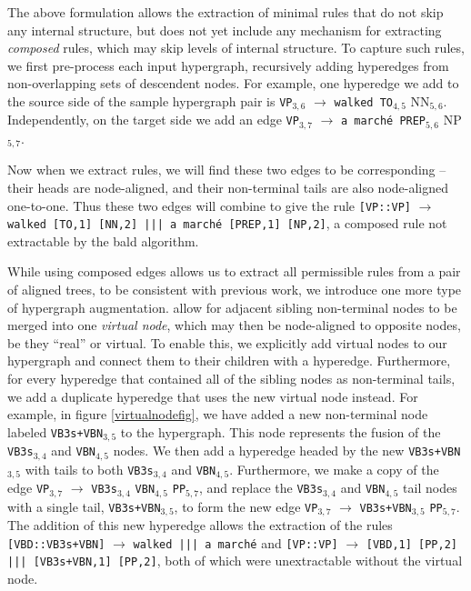 \documentclass[nofonts]{pbml} %
\begin{document}
The above formulation allows the extraction of minimal rules that do not skip any internal structure, but does not yet
include any mechanism for extracting \emph{composed} rules, which may skip levels of internal structure.
To capture such rules, we first pre-process each input hypergraph, recursively adding hyperedges from non-overlapping sets
of descendent nodes. For example, one hyperedge we add to the source side of the sample hypergraph pair is
\texttt{VP}$_{3,6}$ $\rightarrow$ \texttt{walked TO}$_{4,5}$ NN$_{5,6}$. Independently, on the target side we add an edge
\texttt{VP}$_{3,7}$ $\rightarrow$ \texttt{a march\'{e} PREP}$_{5,6}$ NP$_{5,7}$.

Now when we extract rules, we will find these two edges to be corresponding -- their heads are node-aligned, and their non-terminal
tails are also node-aligned one-to-one. Thus these two edges will combine to give the rule
\texttt{[VP::VP]} $\rightarrow$ \texttt{walked [TO,1] [NN,2] ||| a march\'{e} [PREP,1] [NP,2]}, a composed rule not extractable
by the bald algorithm.

While using composed edges allows us to extract all permissible rules from a pair of aligned trees, to be consistent with previous work,
we introduce one more type of hypergraph augmentation.
\citet{hanneman2011general} allow for adjacent sibling non-terminal nodes to be merged into one \emph{virtual node}, which may then be node-aligned to opposite nodes,
be they ``real'' or virtual. To enable this, we explicitly add virtual nodes to our hypergraph and connect them to their children with a hyperedge.
Furthermore, for every hyperedge that contained all of the sibling nodes
as non-terminal tails, we add a duplicate hyperedge that uses the new virtual node instead. For example, in figure \ref{virtualnodefig}, we have added a new non-terminal node
labeled \texttt{VB3s+VBN}$_{3,5}$ to the hypergraph. This node represents the fusion of the \texttt{VB3s}$_{3,4}$ and \texttt{VBN}$_{4,5}$ nodes.
We then add a hyperedge headed by the new \texttt{VB3s+VBN}$_{3,5}$ with tails to both \texttt{VB3s}$_{3,4}$ and \texttt{VBN}$_{4,5}$.
Furthermore, we make a copy of the edge \texttt{VP}$_{3,7}$ $\rightarrow$ \texttt{VB3s}$_{3,4}$ \texttt{VBN}$_{4,5}$ \texttt{PP}$_{5,7}$, and replace the
\texttt{VB3s}$_{3,4}$ and \texttt{VBN}$_{4,5}$ tail nodes with a single tail, \texttt{VB3s+VBN}$_{3,5}$, to form the new edge
\texttt{VP}$_{3,7}$ $\rightarrow$ \texttt{VB3s+VBN}$_{3,5}$ \texttt{PP}$_{5,7}$. The addition of this new hyperedge allows the extraction of the rules
\texttt{[VBD::VB3s+VBN]} $\rightarrow$ \texttt{walked ||| a march\'{e}} and
\texttt{[VP::VP]} $\rightarrow$ \texttt{[VBD,1] [PP,2]  ||| [VB3s+VBN,1] [PP,2]}, both of which were unextractable without the virtual node.
\end{document}
